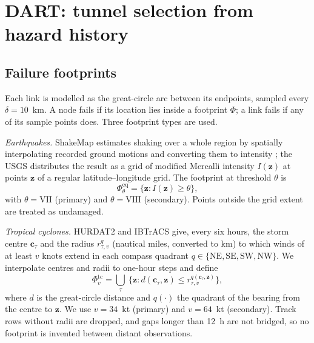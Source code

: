 \documentclass[preprint,12pt]{elsarticle}
\begin{document}
\section{DART: tunnel selection from hazard history}
\label{sec:method}

\subsection{Failure footprints}
\label{sec:footprints}

Each link is modelled as the great-circle arc between its endpoints, sampled every $\delta=10$~km. A node fails if its location lies inside a footprint $\Phi$; a link fails if any of its sample points does. Three footprint types are used.

\emph{Earthquakes.} ShakeMap estimates shaking over a whole region by spatially interpolating recorded ground motions and converting them to intensity \cite{trinet99}; the USGS distributes the result as a grid of modified Mercalli intensity $I(\mathbf{z})$ at points $\mathbf{z}$ of a regular latitude--longitude grid. The footprint at threshold $\theta$ is
\begin{equation}
\Phi^{\mathrm{eq}}_{\theta}=\{\mathbf{z}: I(\mathbf{z})\ge\theta\},
\label{eq:eq}
\end{equation}
with $\theta=\mathrm{VII}$ (primary) and $\theta=\mathrm{VIII}$ (secondary). Points outside the grid extent are treated as undamaged.

\emph{Tropical cyclones.} HURDAT2 \cite{hurdat13} and IBTrACS \cite{ibtracs10} give, every six hours, the storm centre $\mathbf{c}_\tau$ and the radius $r^{q}_{\tau,v}$ (nautical miles, converted to km) to which winds of at least $v$ knots extend in each compass quadrant $q\in\{\mathrm{NE},\mathrm{SE},\mathrm{SW},\mathrm{NW}\}$. We interpolate centres and radii to one-hour steps and define
\begin{equation}
\Phi^{\mathrm{tc}}_{v}=\bigcup_{\tau}\ \{\mathbf{z}: d(\mathbf{c}_\tau,\mathbf{z})\le r^{q(\mathbf{c}_\tau,\mathbf{z})}_{\tau,v}\},
\label{eq:tc}
\end{equation}
where $d$ is the great-circle distance and $q(\cdot)$ the quadrant of the bearing from the centre to $\mathbf{z}$. We use $v=34$~kt (primary) and $v=64$~kt (secondary). Track rows without radii are dropped, and gaps longer than 12~h are not bridged, so no footprint is invented between distant observations.
\end{document}
